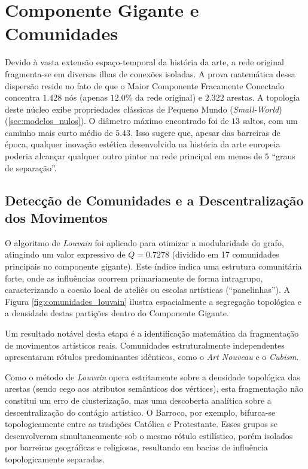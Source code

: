 \documentclass[12pt,a4paper]{article}
\begin{document}
\section{Componente Gigante e Comunidades}
\label{sec:componente_gigante}

Devido à vasta extensão espaço-temporal da história da arte, a rede original fragmenta-se em diversas ilhas de conexões isoladas. A prova matemática dessa dispersão reside no fato de que o Maior Componente Fracamente Conectado concentra $1.428$ nós (apenas $12.0$\% da rede original) e $2.322$ arestas. A topologia deste núcleo exibe propriedades clássicas de Pequeno Mundo (\textit{Small-World}) (\autoref{sec:modelos_nulos}). O diâmetro máximo encontrado foi de $13$ saltos, com um caminho mais curto médio de $5.43$. Isso sugere que, apesar das barreiras de época, qualquer inovação estética desenvolvida na história da arte europeia poderia alcançar qualquer outro pintor na rede principal em menos de $5$ ``graus de separação''.

\subsection{Detecção de Comunidades e a Descentralização dos Movimentos}

O algoritmo de \textit{Louvain} foi aplicado para otimizar a modularidade do grafo, atingindo um valor expressivo de $Q = 0.7278$ (dividido em 17 comunidades principais no componente gigante). Este índice indica uma estrutura comunitária forte, onde as influências ocorrem primariamente de forma intragrupo, caracterizando a coesão local de ateliês ou escolas artísticas (``panelinhas''). A Figura \ref{fig:comunidades_louvain} ilustra espacialmente a segregação topológica e a densidade destas partições dentro do Componente Gigante.

Um resultado notável desta etapa é a identificação matemática da fragmentação de movimentos artísticos reais. Comunidades estruturalmente independentes apresentaram rótulos predominantes idênticos, como o \textit{Art Nouveau} e o \textit{Cubism}.

Como o método de \textit{Louvain} opera estritamente sobre a densidade topológica das arestas (sendo cego aos atributos semânticos dos vértices), esta fragmentação não constitui um erro de clusterização, mas uma descoberta analítica sobre a descentralização do contágio artístico. O Barroco, por exemplo, bifurca-se topologicamente entre as tradições Católica e Protestante. Esses grupos se desenvolveram simultaneamente sob o mesmo rótulo estilístico, porém isolados por barreiras geográficas e religiosas, resultando em bacias de influência topologicamente separadas.
\end{document}
